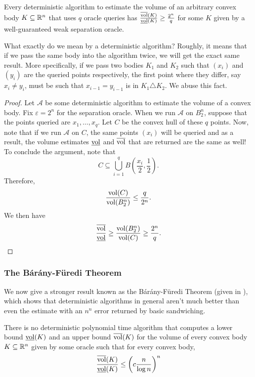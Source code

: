 \begin{lemma}
	Every deterministic algorithm to estimate the volume of an arbitrary convex body $K\subseteq\mathbb{R}^n$ that uses $q$ oracle queries has $\frac{\overline{\operatorname{vol}}(K)}{\underline{\operatorname{vol}}(K)} \geq \frac{2^n}{q}$ for some $K$ given by a well-guaranteed weak separation oracle.
\end{lemma}

What exactly do we mean by a deterministic algorithm? Roughly, it means that if we pass the same body into the algorithm twice, we will get the exact same result. More specifically, if we pass two bodies $K_1$ and $K_2$ such that $(x_i)$ and $(y_i)$ are the queried points respectively, the first point where they differ, say $x_i\neq y_i$, must be such that $x_{i-1}=y_{i-1}$ is in $K_1\triangle K_2$. We abuse this fact.

\begin{proof}
	Let $\mathcal{A}$ be some deterministic algorithm to estimate the volume of a convex body. Fix $\varepsilon=2^n$ for the separation oracle. When we run $\mathcal{A}$ on $B_2^n$, suppose that the points queried are $x_1,\ldots,x_q$. Let $C$ be the convex hull of these $q$ points. Now, note that if we run $\mathcal{A}$ on $C$, the same points $(x_i)$ will be queried and as a result, the volume estimates $\underline{\operatorname{vol}}$ and $\overline{\operatorname{vol}}$ that are returned are the same as well!\\
	To conclude the argument, note that
	\[ C \subseteq \bigcup_{i=1}^q B\left(\frac{x_i}{2},\frac{1}{2}\right). \]
	Therefore,
	\[ \frac{\operatorname{vol}(C)}{\operatorname{vol}(B_2^n)} \leq \frac{q}{2^n}. \]
	We then have
	\[ \frac{\overline{\operatorname{vol}}}{\underline{\operatorname{vol}}} \geq \frac{\operatorname{vol}(B_2^n)}{\operatorname{vol}(C)} \geq \frac{2^n}{q}. \]
\end{proof}

\subsubsection{The B\'ar\'any-F\"uredi Theorem}

We now give a stronger result known as the B\'ar\'any-F\"uredi Theorem (given in \cite{no-deterministic-algo-barany-furedi}), which shows that deterministic algorithms in general aren't much better than even the estimate with an $n^n$ error returned by basic sandwiching.

\begin{ftheo}
	There is no deterministic polynomial time algorithm that computes a lower bound $\underline{\operatorname{vol}}(K)$ and an upper bound $\overline{\operatorname{vol}}(K)$ for the volume of every convex body $K\subseteq\mathbb{R}^n$ given by some oracle such that for every convex body,
	\[ \frac{\overline{\operatorname{vol}}(K)}{\underline{\operatorname{vol}}(K)} \leq \left(c \frac{n}{\log n}\right)^n \]
\end{ftheo}

